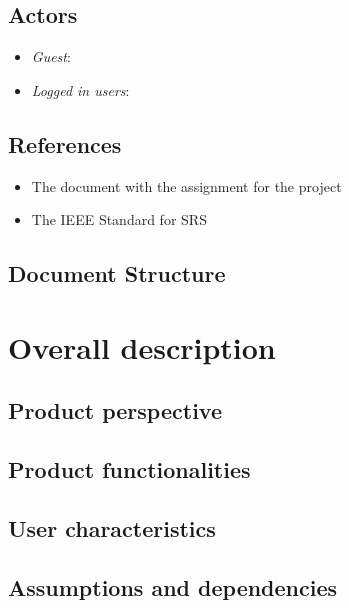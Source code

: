 \documentclass{article}
\begin{document}
\subsection{Actors}
\begin{itemize}
	\item \textit{Guest}: 
	\item \textit{Logged in users}:

\end{itemize}

\subsection{References}
\begin{itemize}
	\item The document with the assignment for the project
	\item The IEEE Standard for SRS 
\end{itemize}
\subsection{Document Structure}


\clearpage
\section{Overall description}

\subsection{Product perspective}



\clearpage

\subsection{Product functionalities}


\subsection{User characteristics}



\subsection{Assumptions and dependencies}
\end{document}
